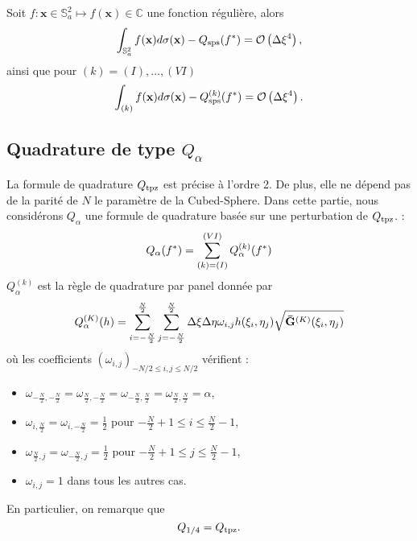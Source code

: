 \begin{theoreme}
Soit $f : \mathbf{x} \in \mathbb{S}_a^2 \mapsto f(\mathbf{x}) \in \mathbb{C}$ une fonction régulière, alors
\begin{equation}
\displaystyle\int_{\mathbb{S}_a^2} f(\mathbf{x}) d\sigma(\mathbf{x}) - Q_{\text{sps}}(f^*) = \mathcal{O} \left( \Delta \xi^4 \right),
\end{equation}
ainsi que pour $(k) = (I), ..., (VI)$
\begin{equation}
\displaystyle\int_{(k)} f(\mathbf{x}) d\sigma(\mathbf{x}) - Q_{\text{sps}}^{(k)}(f^*) = \mathcal{O} \left( \Delta \xi^4 \right).
\end{equation}
\end{theoreme}























\subsection{Quadrature de type $Q_{\alpha}$}

La formule de quadrature $Q_{\text{tpz}}$ est précise à l'ordre 2. De plus, elle ne dépend pas de la parité de $N$ le paramètre de la Cubed-Sphere. Dans cette partie, nous considérons $Q_{\alpha}$ une formule de quadrature basée sur une perturbation de $Q_{\text{tpz}}$. :
\begin{equation}
Q_{\alpha}(f^*)= \displaystyle\sum\limits_{(k)=(I)}^{(VI)} Q^{(k)}_{\alpha}(f^*)
\end{equation}
$Q^{(k)}_{\alpha}$ est la règle de quadrature par panel donnée par
\begin{equation}
Q_{\alpha}^{(K)}(h)=\displaystyle\sum\limits_{i = -\frac{N}{2}}^{\frac{N}{2}}\displaystyle\sum\limits_{j = -\frac{N}{2}}^{\frac{N}{2}} \Delta \xi \Delta \eta \omega_{i,j} h(\xi_i, \eta_j) \sqrt{\mathbf{\bar{G}}^{(K)}(\xi_i, \eta_j)}
\label{eq:alpha par panel}
\end{equation}
où les coefficients $(\omega_{i,j})_{-N/2 \leq i,j \leq N/2}$ vérifient :
\begin{itemize}
\item $\omega_{-\frac{N}{2},-\frac{N}{2}}=\omega_{\frac{N}{2},-\frac{N}{2}}=\omega_{-\frac{N}{2},\frac{N}{2}}=\omega_{\frac{N}{2},\frac{N}{2}}=\alpha$,
\item $\omega_{i,\frac{N}{2}}=\omega_{i,-\frac{N}{2}}=\frac{1}{2}$ pour $-\frac{N}{2}+1 \leq i \leq \frac{N}{2}-1$,
\item $\omega_{\frac{N}{2},j}=\omega_{-\frac{N}{2},j}=\frac{1}{2}$ pour $-\frac{N}{2}+1 \leq j \leq \frac{N}{2}-1$,
\item $\omega_{i,j}=1$ dans tous les autres cas.
\end{itemize}
En particulier, on remarque que
\begin{equation}
Q_{1/4} = Q_{\text{tpz}}.
\end{equation}

